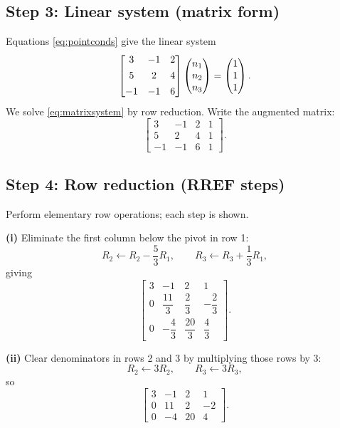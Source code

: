 \documentclass[12pt]{article}
\begin{document}
\subsection*{Step 3: Linear system (matrix form)}
Equations \eqref{eq:pointconds} give the linear system
\begin{equation}
\begin{bmatrix}
3 & -1 & 2\\[4pt]
5 & 2 & 4\\[4pt]
-1 & -1 & 6
\end{bmatrix}
\begin{pmatrix}n_1\\n_2\\n_3\end{pmatrix}
=
\begin{pmatrix}1\\1\\1\end{pmatrix}.
\label{eq:matrixsystem}
\end{equation}
We solve \eqref{eq:matrixsystem} by row reduction.  Write the augmented matrix:
\begin{equation}
\left[
\begin{array}{ccc|c}
3 & -1 & 2 & 1\\[6pt]
5 & 2 & 4 & 1\\[6pt]
-1 & -1 & 6 & 1
\end{array}
\right].
\label{eq:aug0}
\end{equation}

\subsection*{Step 4: Row reduction (RREF steps)}
Perform elementary row operations; each step is shown.

\medskip

\noindent\textbf{(i)} Eliminate the first column below the pivot in row 1:
\[
R_2 \leftarrow R_2 - \frac{5}{3}R_1,\qquad
R_3 \leftarrow R_3 + \frac{1}{3}R_1,
\]
giving
\begin{equation}
\left[
\begin{array}{ccc|c}
3 & -1 & 2 & 1\\[6pt]
0 & \dfrac{11}{3} & \dfrac{2}{3} & -\dfrac{2}{3}\\[8pt]
0 & -\dfrac{4}{3} & \dfrac{20}{3} & \dfrac{4}{3}
\end{array}
\right].
\label{eq:aug1}
\end{equation}

\medskip

\noindent\textbf{(ii)} Clear denominators in rows 2 and 3 by multiplying those rows by \(3\):
\[
R_2 \leftarrow 3R_2,\qquad R_3 \leftarrow 3R_3,
\]
so
\begin{equation}
\left[
\begin{array}{ccc|c}
3 & -1 & 2 & 1\\[6pt]
0 & 11 & 2 & -2\\[6pt]
0 & -4 & 20 & 4
\end{array}
\right].
\label{eq:aug2}
\end{equation}
\end{document}
